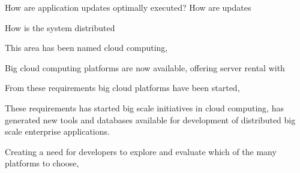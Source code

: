 How are application updates optimally executed?
How are updates 

How is the system distributed

This area has been named cloud computing, 

Big cloud computing platforms are now available, offering server rental with 

From these requirements big cloud platforms have been started, 

These requirements has started big scale initiatives in cloud computing, has generated new tools and databases available for development of distributed big scale enterprise applications. 

Creating a need for developers to explore and evaluate which of the many platforms to choose, 